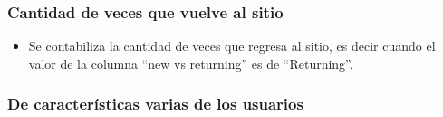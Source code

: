 \documentclass[a4paper]{article}
\begin{document}
        \subsubsection{Cantidad de veces que vuelve al sitio}\label{subsubsec:Cant returnings}
        
        \begin{itemize}
            \item Se contabiliza la cantidad de veces que regresa al sitio, es decir cuando el valor de la columna ``new vs returning'' es de ``Returning''. \\
        \end{itemize}
        
        \subsubsection{De características varias de los usuarios}\label{subsubsec:caracteristicas usuarios}
        
\end{document}
